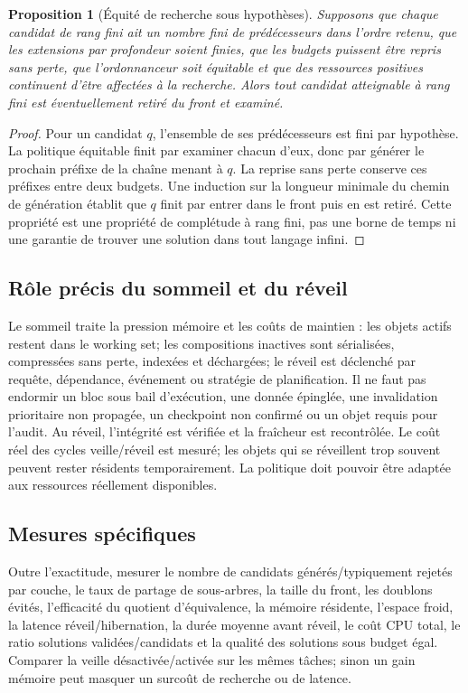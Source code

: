 \documentclass[11pt,a4paper]{article}
\theoremstyle{definition}
\theoremstyle{plain}
\newtheorem{proposition}[definition]{Proposition}
\theoremstyle{remark}
\begin{document}
\begin{proposition}[Équité de recherche sous hypothèses]
Supposons que chaque candidat de rang fini ait un nombre fini de prédécesseurs dans l'ordre retenu, que les extensions par profondeur soient finies, que les budgets puissent être repris sans perte, que l'ordonnanceur soit équitable et que des ressources positives continuent d'être affectées à la recherche. Alors tout candidat atteignable à rang fini est éventuellement retiré du front et examiné.
\end{proposition}
\begin{proof}
Pour un candidat $q$, l'ensemble de ses prédécesseurs est fini par hypothèse. La politique équitable finit par examiner chacun d'eux, donc par générer le prochain préfixe de la chaîne menant à $q$. La reprise sans perte conserve ces préfixes entre deux budgets. Une induction sur la longueur minimale du chemin de génération établit que $q$ finit par entrer dans le front puis en est retiré. Cette propriété est une propriété de complétude à rang fini, pas une borne de temps ni une garantie de trouver une solution dans tout langage infini.
\end{proof}

\subsection{Rôle précis du sommeil et du réveil}
Le sommeil traite la pression mémoire et les coûts de maintien : les objets actifs restent dans le working set; les compositions inactives sont sérialisées, compressées sans perte, indexées et déchargées; le réveil est déclenché par requête, dépendance, événement ou stratégie de planification. Il ne faut pas endormir un bloc sous bail d'exécution, une donnée épinglée, une invalidation prioritaire non propagée, un checkpoint non confirmé ou un objet requis pour l'audit. Au réveil, l'intégrité est vérifiée et la fraîcheur est recontrôlée. Le coût réel des cycles veille/réveil est mesuré; les objets qui se réveillent trop souvent peuvent rester résidents temporairement. La politique doit pouvoir être adaptée aux ressources réellement disponibles.

\subsection{Mesures spécifiques}
Outre l'exactitude, mesurer le nombre de candidats générés/typiquement rejetés par couche, le taux de partage de sous-arbres, la taille du front, les doublons évités, l'efficacité du quotient d'équivalence, la mémoire résidente, l'espace froid, la latence réveil/hibernation, la durée moyenne avant réveil, le coût CPU total, le ratio solutions validées/candidats et la qualité des solutions sous budget égal. Comparer la veille désactivée/activée sur les mêmes tâches; sinon un gain mémoire peut masquer un surcoût de recherche ou de latence.
\end{document}
